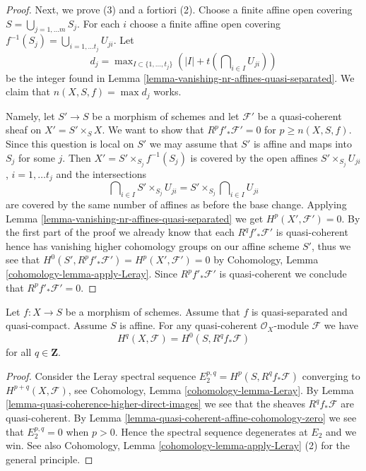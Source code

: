 \begin{proof}
\medskip\noindent
Next, we prove (3) and a fortiori (2). Choose a finite affine open
covering $S = \bigcup_{j = 1, \ldots m} S_j$. For each $i$ choose
a finite affine open covering
$f^{-1}(S_j) = \bigcup_{i = 1, \ldots t_j} U_{ji} $.
Let
$$
d_j = \max\nolimits_{I \subset \{1, \ldots, t_j\}}
\left(|I| + t(\bigcap\nolimits_{i \in I} U_{ji})\right)
$$
be the integer found in
Lemma \ref{lemma-vanishing-nr-affines-quasi-separated}.
We claim that $n(X, S, f) = \max d_j$ works.

\medskip\noindent
Namely, let $S' \to S$ be a morphism of schemes and let
$\mathcal{F}'$ be a quasi-coherent sheaf on $X' = S' \times_S X$.
We want to show that $R^pf'_*\mathcal{F}' = 0$ for $p \geq n(X, S, f)$.
Since this question is local on $S'$ we may assume that $S'$ is affine
and maps into $S_j$ for some $j$. Then $X' = S' \times_{S_j} f^{-1}(S_j)$
is covered by the open affines $S' \times_{S_j} U_{ji}$, $i = 1, \ldots t_j$
and the intersections
$$
\bigcap\nolimits_{i \in I} S' \times_{S_j} U_{ji} =
S' \times_{S_j} \bigcap\nolimits_{i \in I} U_{ji}
$$
are covered by the same number of affines as before the base change.
Applying
Lemma \ref{lemma-vanishing-nr-affines-quasi-separated}
we get $H^p(X', \mathcal{F}') = 0$. By the first part of the proof
we already know that each $R^qf'_*\mathcal{F}'$ is quasi-coherent
hence has vanishing higher cohomology groups on our affine scheme $S'$,
thus we see that $H^0(S', R^pf'_*\mathcal{F}') = H^p(X', \mathcal{F}') = 0$
by Cohomology, Lemma \ref{cohomology-lemma-apply-Leray}.
Since $R^pf'_*\mathcal{F}'$ is quasi-coherent
we conclude that $R^pf'_*\mathcal{F}' = 0$.
\end{proof}

\begin{lemma}
\label{lemma-quasi-coherence-higher-direct-images-application}
Let $f : X \to S$ be a morphism of schemes.
Assume that $f$ is quasi-separated and quasi-compact.
Assume $S$ is affine.
For any quasi-coherent $\mathcal{O}_X$-module $\mathcal{F}$
we have
$$
H^q(X, \mathcal{F}) = H^0(S, R^qf_*\mathcal{F})
$$
for all $q \in \mathbf{Z}$.
\end{lemma}

\begin{proof}
Consider the Leray spectral sequence $E_2^{p, q} = H^p(S, R^qf_*\mathcal{F})$
converging to $H^{p + q}(X, \mathcal{F})$, see
Cohomology, Lemma \ref{cohomology-lemma-Leray}.
By Lemma \ref{lemma-quasi-coherence-higher-direct-images}
we see that the sheaves $R^qf_*\mathcal{F}$ are quasi-coherent.
By Lemma \ref{lemma-quasi-coherent-affine-cohomology-zero}
we see that $E_2^{p, q} = 0$ when $p > 0$.
Hence the spectral sequence degenerates at $E_2$ and we win.
See also
Cohomology, Lemma \ref{cohomology-lemma-apply-Leray} (2)
for the general principle.
\end{proof}








